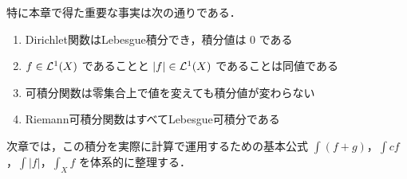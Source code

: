 特に本章で得た重要な事実は次の通りである．
\begin{enumerate}
    \item Dirichlet関数はLebesgue積分でき，積分値は $0$ である
    \item $f\in\mathcal L^1(X)$ であることと $|f|\in\mathcal L^1(X)$ であることは同値である
    \item 可積分関数は零集合上で値を変えても積分値が変わらない
    \item Riemann可積分関数はすべてLebesgue可積分である
\end{enumerate}

次章では，この積分を実際に計算で運用するための基本公式
$\int(f+g)$，$\int cf$，$\int |f|$，$\int_X f$ を体系的に整理する．
